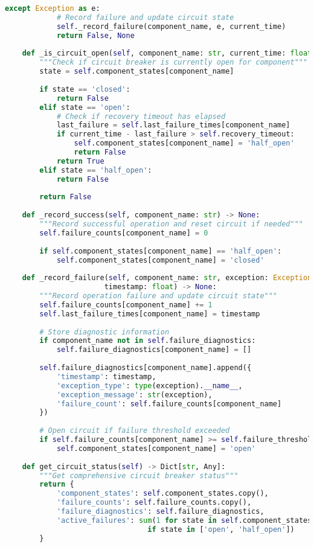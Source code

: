 \begin{lstlisting}[language=Python, caption=Circuit Breaker Pattern for Reliable Operation]
        except Exception as e:
            # Record failure and update circuit state
            self._record_failure(component_name, e, current_time)
            return False, None
    
    def _is_circuit_open(self, component_name: str, current_time: float) -> bool:
        """Check if circuit breaker is currently open for component"""
        state = self.component_states[component_name]
        
        if state == 'closed':
            return False
        elif state == 'open':
            # Check if recovery timeout has elapsed
            last_failure = self.last_failure_times[component_name]
            if current_time - last_failure > self.recovery_timeout:
                self.component_states[component_name] = 'half_open'
                return False
            return True
        elif state == 'half_open':
            return False
        
        return False
    
    def _record_success(self, component_name: str) -> None:
        """Record successful operation and reset circuit if needed"""
        self.failure_counts[component_name] = 0
        
        if self.component_states[component_name] == 'half_open':
            self.component_states[component_name] = 'closed'
    
    def _record_failure(self, component_name: str, exception: Exception, 
                       timestamp: float) -> None:
        """Record operation failure and update circuit state"""
        self.failure_counts[component_name] += 1
        self.last_failure_times[component_name] = timestamp
        
        # Store diagnostic information
        if component_name not in self.failure_diagnostics:
            self.failure_diagnostics[component_name] = []
        
        self.failure_diagnostics[component_name].append({
            'timestamp': timestamp,
            'exception_type': type(exception).__name__,
            'exception_message': str(exception),
            'failure_count': self.failure_counts[component_name]
        })
        
        # Open circuit if failure threshold exceeded
        if self.failure_counts[component_name] >= self.failure_threshold:
            self.component_states[component_name] = 'open'
    
    def get_circuit_status(self) -> Dict[str, Any]:
        """Get comprehensive circuit breaker status"""
        return {
            'component_states': self.component_states.copy(),
            'failure_counts': self.failure_counts.copy(),
            'failure_diagnostics': self.failure_diagnostics,
            'active_failures': sum(1 for state in self.component_states.values() 
                                 if state in ['open', 'half_open'])
        }
    

\end{lstlisting}
